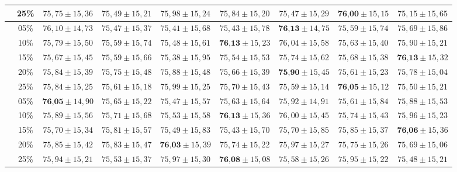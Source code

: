 \begin{table}[h]
{\begin{tabular}{|c|c|c|c|c|c|c|c|c|}
                 & 25\% & $75,75 \pm 15,36$ & $75,49 \pm 15,21$ & $75,98 \pm 15,24$ & $75,84 \pm 15,20$ & $75,47 \pm 15,29$ & $\textbf{76,00} \pm 15,15$ & $75,15 \pm 15,65$ \\ \hline
                \parbox[t]{3mm}{}
                 & 05\% & $76,10 \pm 14,73$ & $75,47 \pm 15,37$ & $75,41 \pm 15,68$ & $75,43 \pm 15,78$ & $\textbf{76,13} \pm 14,75$ & $75,59 \pm 15,74$ & $75,69 \pm 15,86$ \\
                 & 10\% & $75,79 \pm 15,50$ & $75,59 \pm 15,74$ & $75,48 \pm 15,61$ & $\textbf{76,13} \pm 15,23$ & $76,04 \pm 15,58$ & $75,63 \pm 15,40$ & $75,90 \pm 15,21$ \\
                 & 15\% & $75,67 \pm 15,45$ & $75,59 \pm 15,66$ & $75,38 \pm 15,95$ & $75,54 \pm 15,53$ & $75,74 \pm 15,62$ & $75,68 \pm 15,38$ & $\textbf{76,13} \pm 15,32$ \\
                 & 20\% & $75,84 \pm 15,39$ & $75,75 \pm 15,48$ & $75,88 \pm 15,48$ & $75,66 \pm 15,39$ & $\textbf{75,90} \pm 15,45$ & $75,61 \pm 15,23$ & $75,78 \pm 15,04$ \\
                 & 25\% & $75,84 \pm 15,25$ & $75,61 \pm 15,18$ & $75,99 \pm 15,25$ & $75,70 \pm 15,43$ & $75,59 \pm 15,14$ & $\textbf{76,05} \pm 15,12$ & $75,50 \pm 15,21$ \\ \hline
                \parbox[t]{3mm}{}
                 & 05\% & $\textbf{76,05} \pm 14,90$ & $75,65 \pm 15,22$ & $75,47 \pm 15,57$ & $75,63 \pm 15,64$ & $75,92 \pm 14,91$ & $75,61 \pm 15,84$ & $75,88 \pm 15,53$ \\
                 & 10\% & $75,89 \pm 15,56$ & $75,71 \pm 15,68$ & $75,53 \pm 15,58$ & $\textbf{76,13} \pm 15,36$ & $76,00 \pm 15,45$ & $75,74 \pm 15,43$ & $75,96 \pm 15,23$ \\
                 & 15\% & $75,70 \pm 15,34$ & $75,81 \pm 15,57$ & $75,49 \pm 15,83$ & $75,43 \pm 15,70$ & $75,70 \pm 15,85$ & $75,85 \pm 15,37$ & $\textbf{76,06} \pm 15,36$ \\
                 & 20\% & $75,85 \pm 15,42$ & $75,83 \pm 15,47$ & $\textbf{76,03} \pm 15,39$ & $75,74 \pm 15,22$ & $75,97 \pm 15,27$ & $75,75 \pm 15,26$ & $75,69 \pm 15,06$ \\
                 & 25\% & $75,94 \pm 15,21$ & $75,53 \pm 15,37$ & $75,97 \pm 15,30$ & $\textbf{76,08} \pm 15,08$ & $75,58 \pm 15,26$ & $75,95 \pm 15,22$ & $75,48 \pm 15,21$ \\ \hline
            \end{tabular}%
        }
        \label{tab:rpart-acc}
    \end{table}
    
